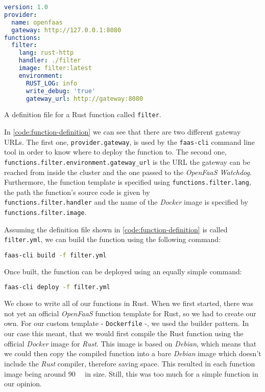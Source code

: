 \begin{code}[H]
  \centering
  \begin{lstlisting}[language=yaml]
version: 1.0
provider:
  name: openfaas
  gateway: http://127.0.0.1:8080
functions:
  filter:
    lang: rust-http
    handler: ./filter
    image: filter:latest
    environment:
      RUST_LOG: info
      write_debug: 'true'
      gateway_url: http://gateway:8080
  \end{lstlisting}
  \caption{A definition file for a Rust function called \texttt{filter}.}
  \label{code:function-definition}
\end{code}

In \autoref{code:function-definition} we can see that there are two different gateway URLs. The
first one, \texttt{provider.gateway}, is used by the \texttt{faas-cli} command line tool in order to
know where to deploy the function to. The second one,
\texttt{functions.filter.environment.gateway\_url} is the URL the gateway can be reached from inside
the cluster and the one passed to the \textit{OpenFaaS Watchdog}. Furthermore, the function template
is specified using \texttt{functions.filter.lang}, the path the function's source code is given by
\\
\texttt{functions.filter.handler} and the name of the \textit{Docker} image is specified by \\
\texttt{functions.filter.image}.

Assuming the definition file shown in \autoref{code:function-definition} is called
\texttt{filter.yml}, we can build the function using the following command:

\begin{lstlisting}[language=bash]
faas-cli build -f filter.yml
\end{lstlisting}

Once built, the function can be deployed using an equally simple command:

\begin{lstlisting}[language=bash]
faas-cli deploy -f filter.yml
\end{lstlisting}

We chose to write all of our functions in Rust. When we first started, there was not yet an official
\textit{OpenFaaS} function template for Rust, so we had to create our own. For our custom template -
\texttt{Dockerfile} -, we used the builder pattern. In our case this meant, that we would first
compile the Rust function using the official \textit{Docker} image for \textit{Rust}. This image is
based on \textit{Debian}, which means that we could then copy the compiled function into a bare
\textit{Debian} image which doesn't include the \textit{Rust} compiler, therefore saving space. This
resulted in each function image being around \SI{90}{\mega\byte} in size. Still, this was too much
for a simple function in our opinion.

